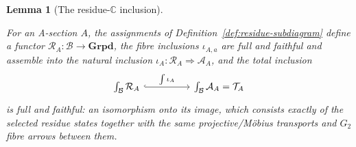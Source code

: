 \documentclass[11pt]{article}
\newcommand{\CC}{\mathbb{C}}
\providecommand{\lean}[1]{}
\providecommand{\notready}{}
\providecommand{\uses}[1]{}
\theoremstyle{plain}
\newtheorem{lemma}[theorem]{Lemma}
\theoremstyle{definition}
\theoremstyle{remark}
\begin{document}
\begin{lemma}[The residue-$\CC$ inclusion]\label{lem:iota-full-faithful}
\lean{ASection.AsectionCResidueInclusionTotal,
ASection.AsectionCResidueInclusionTotal_full,
ASection.AsectionCResidueInclusionTotal_faithful}
\notready
\uses{def:A-section, def:base, def:residue-subdiagram}
For an A-section $A$, the assignments of
Definition~\ref{def:residue-subdiagram} define a functor
$\mathcal R_A:\mathcal B\to\mathbf{Grpd}$, the fibre inclusions
$\iota_{A,a}$ are full and faithful and assemble into the natural
inclusion $\iota_A:\mathcal R_A\Rightarrow\mathcal A_A$, and the total
inclusion
\[
\begin{tikzcd}[column sep=huge]
\int_{\mathcal B}\mathcal R_A \arrow[r, hook, "\int\iota_A"] & \int_{\mathcal B}\mathcal A_A=\mathcal T_A
\end{tikzcd}
\]
is full and faithful: an isomorphism onto its image, which consists exactly of the
selected residue states together with the same projective/M\"obius transports and
$G_2$ fibre arrows between them.
\end{lemma}
\end{document}
